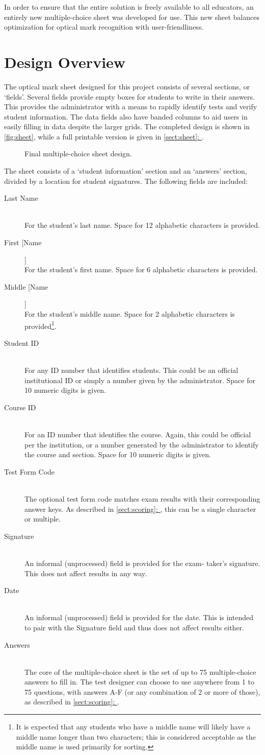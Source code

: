 \documentclass[12pt, letterpaper]{report}
\newcommand*{\sectref}[1]{\hypersetup{linkcolor=usfgreen}\hyperref[{#1}]{\ref*{#1}: \nameref*{#1}}}
\newcommand*{\itemref}[1]{\hypersetup{linkcolor=usfgreen}\hyperref[{#1}]{\autoref*{#1}}}
\newcommand*{\boxedimage}[1]{\fbox{\texttt{[image: img/\#1]}}}
\newcommand{\fig}[3]{
  \begin{figure}[h]
    \caption{#1}
    \label{#3}
    \centering
    \boxedimage{#2}
  \end{figure}
}
\newcommand*{\descitem}[1]{\item[#1] \hfill \\ }
\begin{document}
In order to ensure that the entire solution is freely available to all
educators, an entirely new multiple-choice sheet was developed for use.
This new sheet balances optimization for optical mark recognition with
user-friendliness.

\section{Design Overview}
The optical mark sheet designed for this project consists of several sections,
or `fields'. Several fields provide empty boxes for students to write in their
answers. This provides the administrator with a means to rapidly identify tests
and verify student information. The data fields
also have banded columns to aid users in easily filling in data despite the
larger grids. The completed design is shown in
\itemref{fig:sheet}, while a full printable version is given in \sectref{sect:sheet}.

\fig{Final multiple-choice sheet design.}{sheet.png}{fig:sheet}

The sheet consists of a `student information' section and an `answers' section,
divided by a location for student signatures. The following fields are
included:
\begin{description}
  \descitem{Last Name} For the student's last name. Space for 12 alphabetic
  characters is provided.
  \descitem{First [Name]} For the student's first name. Space for 6 alphabetic
  characters is provided.
  \descitem{Middle [Name]} For the student's middle name. Space for 2 alphabetic
  characters is provided\footnote{It is expected that any students who have a
  middle name will likely have a middle name longer than two characters; this
  is considered acceptable as the middle name is used primarily for sorting.}.
  \descitem{Student ID} For any ID number that identifies students. This could be an
  official institutional ID or simply a number given by the administrator. Space
  for 10 numeric digits is given.
  \descitem{Course ID} For an ID number that identifies the course. Again, this
  could be official per the institution, or a number generated by the
  administrator to identify the course and section. Space for 10 numeric digits
  is given.
  \descitem{Test Form Code} The optional test form code matches exam results with
  their corresponding answer keys. As described in \sectref{sect:scoring}, this can
  be a single character or multiple.
  \descitem{Signature} An informal (unprocessed) field is provided for the exam-
  taker's signature. This does not affect results in any way.
  \descitem{Date} An informal (unprocessed) field is provided for the date. This is
  intended to pair with the Signature field and thus does not affect results
  either.
  \descitem{Answers} The core of the multiple-choice sheet is the set of up to 75
  multiple-choice answers to fill in. The test designer can choose to use
  anywhere from 1 to 75 questions, with answers A-F (or any combination of 2 or
  more of those), as described in \sectref{sect:scoring}.
\end{description}
\end{document}
